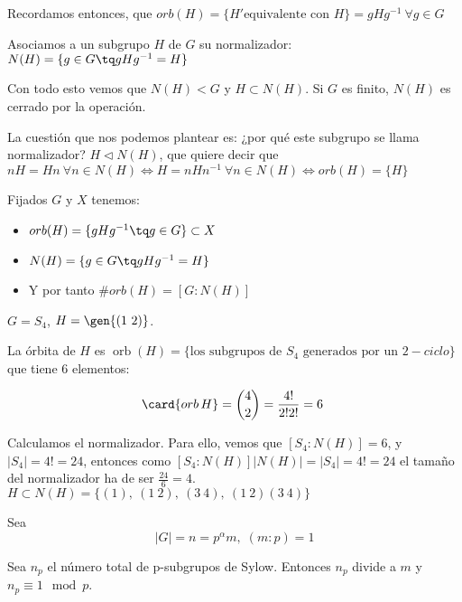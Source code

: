 \documentclass[nochap]{apuntes}
\begin{document}
Recordamos entonces, que $orb(H) = \{ H' \text{equivalente con }H \} = gHg^{-1}\ \forall g \in G$

Asociamos a un subgrupo $H$ de $G$ su normalizador:
$N(H) = \{ g\in G \tq gHg^{-1} = H \}$

Con todo esto vemos que $N(H)<G$ y $H\subset N(H)$. Si $G$ es finito, $N(H)$ es cerrado por la operación.

La cuestión que nos podemos plantear es: ¿por qué este subgrupo se llama normalizador?
\obs $H \lhd N(H)$, que quiere decir que $nH = Hn \ \forall n \in N(H) \iff H = nHn^{-1}\ \forall n \in N(H) \iff orb(H) = \{ H \}$

Fijados $G$ y $X$ tenemos:
\begin{itemize}
\item $orb(H) = \{gHg^{-1} \tq g\in G \} \subset X$
\item $N(H) = \{ g \in G \tq gHg^{-1} = H \}$
\item Y por tanto $\# orb(H) = [G:N(H)]$
\end{itemize}

\begin{example}
$G = S_4$, $H = \gen{(1\ 2)}$.

La órbita de $H$ es $\mathop{orb}(H) = \{ \text{los subgrupos de }S_4 \text{ generados por un } 2-ciclo \}$ que tiene 6 elementos:

\[ \card{\mathop{orb} H} = {4 \choose 2} = \frac{4!}{2!2!} = 6 \]


Calculamos el normalizador. Para ello, vemos que $[S_4:N(H)] = 6$, y $|S_4|=4!=24$, entonces como $[S_4:N(H)]|N(H)|=|S_4|=4!=24$ el tamaño del normalizador ha de ser $\frac{24}{6}=4$.\\
$H\subset N(H) = \{(1),\ (1\ 2),\ (3\ 4),\ (1\ 2)(3\ 4) \}$

\end{example}

\begin{theorem} Sea
\[ |G| = n = p^{\alpha} m,\; (m:p) = 1 \]

Sea $n_p$ el número total de p-subgrupos de Sylow. Entonces $n_p$ divide a $m$ y $n_p \equiv 1 \mod{p}$.
\end{theorem}
\end{document}
